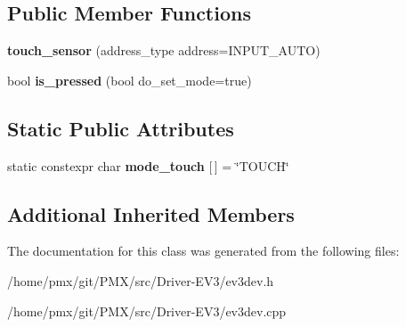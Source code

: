 \subsection*{Public Member Functions}
\begin{DoxyCompactItemize}
\item 
\mbox{\label{classev3dev_1_1touch__sensor_a2e1962dfe9abe42d5a36500ca2857af1}} 
{\bfseries touch\+\_\+sensor} (address\+\_\+type address=I\+N\+P\+U\+T\+\_\+\+A\+U\+TO)
\item 
\mbox{\label{classev3dev_1_1touch__sensor_ac4b8d2ec1d250f5a638aadc1f2a2e68a}} 
bool {\bfseries is\+\_\+pressed} (bool do\+\_\+set\+\_\+mode=true)
\end{DoxyCompactItemize}
\subsection*{Static Public Attributes}
\begin{DoxyCompactItemize}
\item 
\mbox{\label{classev3dev_1_1touch__sensor_ae9b2a58e6accfce6df27c0c4ae2c842d}} 
static constexpr char {\bfseries mode\+\_\+touch} \mbox{[}$\,$\mbox{]} = \char`\"{}T\+O\+U\+CH\char`\"{}
\end{DoxyCompactItemize}
\subsection*{Additional Inherited Members}


The documentation for this class was generated from the following files\+:\begin{DoxyCompactItemize}
\item 
/home/pmx/git/\+P\+M\+X/src/\+Driver-\/\+E\+V3/ev3dev.\+h\item 
/home/pmx/git/\+P\+M\+X/src/\+Driver-\/\+E\+V3/ev3dev.\+cpp\end{DoxyCompactItemize}
